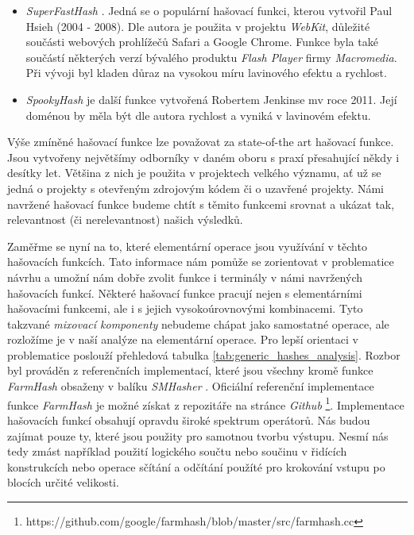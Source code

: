 \begin{itemize}
	\item \textit{SuperFastHash} \cite{Hsieh2004-2008}. Jedná se o populární hašovací funkci, kterou vytvořil Paul Hsieh (2004 - 2008). Dle autora je použita
		v projektu \textit{WebKit}, důležité součásti webových prohlížečů Safari a Google Chrome. Funkce byla také součástí
		některých verzí bývalého produktu \textit{Flash Player} firmy \textit{Macromedia}. Při vývoji byl kladen
		důraz na vysokou míru lavinového efektu a rychlost. 
		
	\item \textit{SpookyHash} \cite{Jenkins2012} je další funkce vytvořená Robertem Jenkinse mv roce 2011. Její doménou by měla být dle autora
		rychlost a vyniká v lavinovém efektu. 
\end{itemize}

Výše zmíněné hašovací funkce lze považovat za state-of-the art hašovací funkce. Jsou vytvořeny největšímy odborníky v daném
oboru s praxí přesahující někdy i desítky let. Většina z nich je použita v projektech velkého významu, ať už se jedná o
projekty s otevřeným zdrojovým kódem či o uzavřené projekty. Námi navržené hašovací funkce budeme chtít s těmito
funkcemi srovnat a ukázat tak, relevantnost (či nerelevantnost) našich výsledků.

Zaměřme se nyní na to, které elementární operace jsou využívání v těchto hašovacích funkcích. Tato informace nám pomůže se
zorientovat v problematice návrhu a umožní nám dobře zvolit funkce i terminály v námi navržených hašovacích funkcí. Některé
hašovací funkce pracují nejen s elementárními hašovacími funkcemi, ale i s jejich vysokoúrovnovými kombinacemi. Tyto
takzvané \textit{mixovací komponenty} nebudeme chápat jako samostatné operace, ale rozložíme je v naší analýze na
elementární operace. Pro lepší orientaci v problematice poslouží přehledová tabulka \ref{tab:generic_hashes_analysis}.
Rozbor byl prováděn z referenčních implementací, které jsou všechny kromě funkce \textit{FarmHash} obsaženy v balíku
\textit{SMHasher} \cite{appleby2016}. Oficiální referenční implementace funkce \textit{FarmHash} je možné získat z repozitáře na
stránce \textit{Github} \footnote{https://github.com/google/farmhash/blob/master/src/farmhash.cc}. Implementace hašovacích
funkcí obsahují opravdu široké spektrum operátorů. Nás budou zajímat pouze ty, které jsou použity pro samotnou tvorbu
výstupu. Nesmí nás tedy zmást například použití logického součtu nebo součinu v řidících konstrukcích nebo operace
sčítání a odčítání použíté pro krokování vstupu po blocích určité velikosti. 

